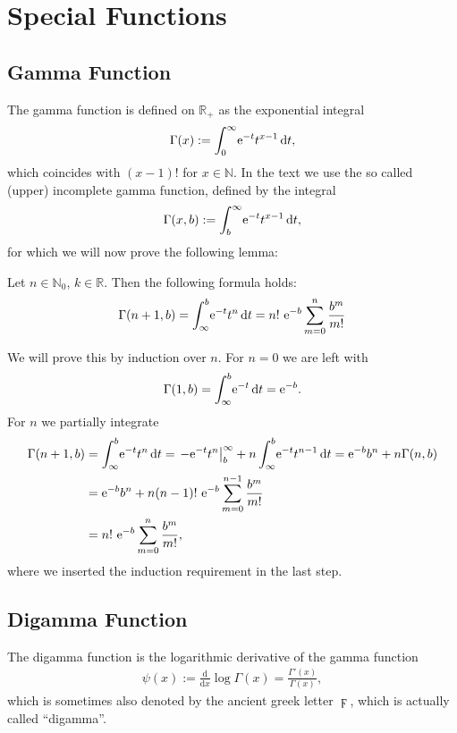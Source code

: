 \section{Special Functions}
\subsection{Gamma Function}
\label{app:gamma}
The gamma function is defined on $\mathbb{R}_{+}$ as the exponential integral
\begin{align}
    \Gamma(x) := \Integ[\infty]{0}{t}{\Eto{-t}t^{x-1}},
    \label{def:gamma}
\end{align}
which coincides with $(x-1)!$ for $x\in\mathbb{N}$. In the text we use the so
called (upper) incomplete gamma function, defined by the integral
\begin{align}
  \Gamma(x,b) := \Integ[\infty]{b}{t}{\Eto{-t}t^{x-1}},
\end{align}
for which we will now prove the following lemma:
\begin{Lemma}
  \label{lem:incomplete-gamma}
  Let $n\in\mathbb{N}_0$, $k\in\mathbb{R}$. Then the following formula holds:
  \begin{align}
    \Gamma(n+1, b) = \Integ[b]{\infty}{t}{\Eto{-t} t^n} = n!\ \Eto{-b}\sum_{m=0}^n
    \frac{b^m}{m!}
  \end{align}
  \begin{Proof}
    We will prove this by induction over $n$. For $n = 0$ we are left with
    \begin{align*}
      \Gamma(1, b) = \Integ[b]{\infty}{t}{\Eto{-t}} = \Eto{-b}.
    \end{align*}
    For $n$ we partially integrate
    \begin{align*}
      \Gamma(n+1, b) &= \Integ[b]{\infty}{t}{\Eto{-t} t^n} 
                     = \left.-\Eto{-t} t^n \right|_{b}^{\infty} +
      n\Integ[b]{\infty}{t}{\Eto{-t}t^{n-1}}
      = \Eto{-b} b^n + n\Gamma(n, b) \\
      &= \Eto{-b} b^n + n (n-1)!\ \Eto{-b}\sum_{m=0}^{n-1} \frac{b^m}{m!} \\
      &= n!\ \Eto{-b} \sum_{m=0}^n \frac{b^m}{m!},
    \end{align*}
    where we inserted the induction requirement in the last step.
  \end{Proof}
\end{Lemma}

\subsection{Digamma Function}
The digamma function is the logarithmic derivative of the gamma function
\begin{align}
    \psi(x) := \frac{\mathrm d}{\mathrm dx}\log{\Gamma(x)}
            = \frac{\Gamma'(x)}{\Gamma(x)},
    \label{def:digamma}
\end{align}
which is sometimes also denoted by the ancient greek letter $\digamma$, which is
actually called ``digamma''.

